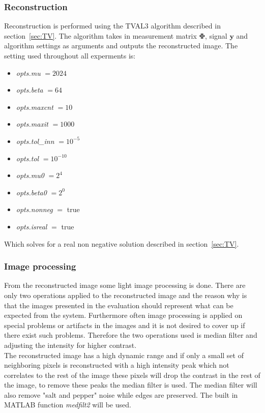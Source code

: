 \subsubsection{Reconstruction}
Reconstruction is performed using the TVAL3 algorithm described in section~\ref{sec:TV}. The algorithm takes in measurement matrix $\mathbf{\Phi}$, signal $\mathbf{y}$ and algorithm settings as arguments and outputs the reconstructed image. The setting used throughout all experments is:

\begin{itemize}
\item \textit{opts.mu} $= 2024$
\item \textit{opts.beta} $= 64$
\item \textit{opts.maxcnt} $= 10$
\item \textit{opts.maxit} $= 1000$
\item \textit{opts.tol\_inn} $= 10^{-5}$
\item \textit{opts.tol} $= 10^{-10}$ 
\item \textit{opts.mu0} $= 2^4$ 
\item \textit{opts.beta0} $= 2^0$
\item \textit{opts.nonneg} $=$ true 
\item \textit{opts.isreal} $=$ true	
\end{itemize} 

Which solves for a real non negative solution described in section~\ref{sec:TV}. 


\subsubsection{Image processing}
From the reconstructed image some light image processing is done. There are only two operations applied to the reconstructed image and the reason why is that the images presented in the evaluation should represent what can be expected from the system. Furthermore often image processing is applied on special problems or artifacts in the images and it is not desired to cover up if there exist such problems. Therefore the two operations used is median filter and adjusting the intensity for higher contrast.\\[0.1in]

The reconstructed image has a high dynamic range and if only a small set of neighboring pixels is reconstructed with a high intensity peak which not correlates to the rest of the image these pixels will drop the contrast in the rest of the image, to remove these peaks the median filter is used. The median filter will also remove "salt and pepper" noise while edges are preserved. The built in MATLAB function \textit{medfilt2} will be used.\\[0.1in]

